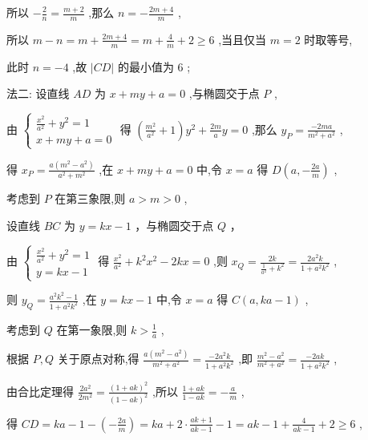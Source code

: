 \documentclass[10pt]{article}
\begin{document}
所以 \(- \frac{2}{n} = \frac{m + 2}{m}\) ,那么 \(n =  - \frac{{2m} + 4}{m}\) ,

所以 \(m - n = m + \frac{{2m} + 4}{m} = m + \frac{4}{m} + 2 \geq  6\) ,当且仅当 \(m = 2\) 时取等号,

此时 \(n =  - 4\) ,故 \(\left| {CD}\right|\) 的最小值为 6 ;

法二: 设直线 \({AD}\) 为 \(x + {my} + a = 0\) ,与椭圆交于点 \(P\) ,

由 \(\left\{  \begin{array}{l} \frac{{x}^{2}}{{a}^{2}} + {y}^{2} = 1 \\  x + {my} + a = 0 \end{array}\right.\) 得 \(\left( {\frac{{m}^{2}}{{a}^{2}} + 1}\right) {y}^{2} + \frac{2m}{a}y = 0\) ,那么 \({y}_{P} = \frac{-{2ma}}{{m}^{2} + {a}^{2}}\) ,

得 \({x}_{P} = \frac{a\left( {{m}^{2} - {a}^{2}}\right) }{{a}^{2} + {m}^{2}}\) ,在 \(x + {my} + a = 0\) 中,令 \(x = a\) 得 \(D\left( {a, - \frac{2a}{m}}\right)\) ,

考虑到 \(P\) 在第三象限,则 \(a > m > 0\) ,

设直线 \({BC}\) 为 \(y = {kx} - 1\) ，与椭圆交于点 \(Q\) ，

由 \(\left\{  \begin{array}{l} \frac{{x}^{2}}{{a}^{2}} + {y}^{2} = 1 \\  y = {kx} - 1 \end{array}\right.\) 得 \(\frac{{x}^{2}}{{a}^{2}} + {k}^{2}{x}^{2} - {2kx} = 0\) ,则 \({x}_{Q} = \frac{2k}{\frac{1}{{a}^{2}} + {k}^{2}} = \frac{2{a}^{2}k}{1 + {a}^{2}{k}^{2}}\) ,

则 \({y}_{Q} = \frac{{a}^{2}{k}^{2} - 1}{1 + {a}^{2}{k}^{2}}\) ,在 \(y = {kx} - 1\) 中,令 \(x = a\) 得 \(C\left( {a,{ka} - 1}\right)\) ,

考虑到 \(Q\) 在第一象限,则 \(k > \frac{1}{a}\) ,

根据 \(P,Q\) 关于原点对称,得 \(\frac{a\left( {{m}^{2} - {a}^{2}}\right) }{{m}^{2} + {a}^{2}} = \frac{-2{a}^{2}k}{1 + {a}^{2}{k}^{2}}\) ,即 \(\frac{{m}^{2} - {a}^{2}}{{m}^{2} + {a}^{2}} = \frac{-{2ak}}{1 + {a}^{2}{k}^{2}}\) ,

由合比定理得 \(\frac{2{a}^{2}}{2{m}^{2}} = \frac{{\left( 1 + ak\right) }^{2}}{{\left( 1 - ak\right) }^{2}}\) ,所以 \(\frac{1 + {ak}}{1 - {ak}} =  - \frac{a}{m}\) ,

得 \({CD} = {ka} - 1 - \left( {-\frac{2a}{m}}\right)  = {ka} + 2 \cdot  \frac{{ak} + 1}{{ak} - 1} - 1 = {ak} - 1 + \frac{4}{{ak} - 1} + 2 \geq  6\) ,
\end{document}

